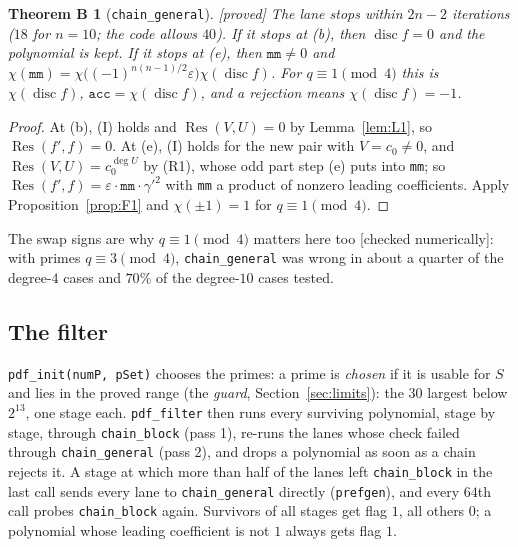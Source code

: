 \documentclass[10pt,a4paper]{article}
\DeclareMathOperator{\Res}{Res}
\DeclareMathOperator{\disc}{disc}
\newcommand{\code}[1]{\texttt{#1}}
\newcommand{\stproved}{\textsf{\small[proved]}\xspace}
\newcommand{\stnum}{\textsf{\small[checked numerically]}\xspace}
\theoremstyle{plain}
\newtheorem*{thmB}{Theorem B}
\theoremstyle{definition}
\begin{document}
\begin{thmB}[\code{chain\_general}]\stproved
The lane stops within $2n-2$ iterations ($18$ for $n=10$; the code allows $40$).  If it stops at (b), then $\disc f=0$ and the polynomial is kept.  If it stops at
(e), then $\code{mm}\neq0$ and $\chi(\code{mm})=\chi\bigl((-1)^{n(n-1)/2}\varepsilon\bigr)\chi(\disc f)$.  For $q\equiv1\pmod4$ this is $\chi(\disc f)$,
$\code{acc}=\chi(\disc f)$, and a rejection means $\chi(\disc f)=-1$.
\end{thmB}
\begin{proof}
At (b), (I) holds and $\Res(V,U)=0$ by Lemma~\ref{lem:L1}, so $\Res(f',f)=0$.  At (e), (I) holds for the new pair with $V=c_0\neq0$, and $\Res(V,U)=c_0^{\deg U}$ by
(R1), whose odd part step (e) puts into \code{mm}; so $\Res(f',f)=\varepsilon\cdot\code{mm}\cdot\gamma'^2$ with \code{mm} a product of nonzero leading coefficients.
Apply Proposition~\ref{prop:F1} and $\chi(\pm1)=1$ for $q\equiv1\pmod4$.
\end{proof}

The swap signs are why $q\equiv1\pmod4$ matters here too \stnum: with primes $q\equiv3\pmod4$, \code{chain\_general} was wrong in about a quarter of the degree-$4$
cases and $70\%$ of the degree-$10$ cases tested.

\subsection{The filter}\label{sec:filter}

\code{pdf\_init(numP, pSet)} chooses the primes: a prime is \emph{chosen} if it is usable for $S$ and lies in the proved range (the \emph{guard},
Section~\ref{sec:limits}): the $30$ largest below $2^{13}$, one stage each.  \code{pdf\_filter} then runs every surviving polynomial, stage by
stage, through \code{chain\_block} (pass 1), re-runs the lanes whose check failed through \code{chain\_general} (pass 2), and drops a polynomial as soon as a chain
rejects it.  A stage at which more than half of the lanes left \code{chain\_block} in the last call sends every lane to \code{chain\_general} directly
(\code{prefgen}), and every $64$th call probes \code{chain\_block} again.  Survivors of all stages get flag $1$, all others $0$; a polynomial whose leading
coefficient is not $1$ always gets flag $1$.
\end{document}
